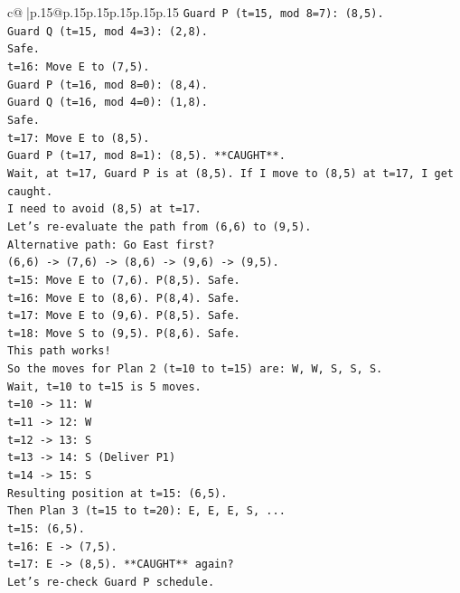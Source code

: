 \documentclass{article}
\begin{document}
{\begin{supertabular}{c@{$\;$}|p{.15\linewidth}@{}p{.15\linewidth}p{.15\linewidth}p{.15\linewidth}p{.15\linewidth}p{.15\linewidth}}
{{{\texttt{Guard P (t=15, mod 8=7): (8,5).} \\
\texttt{Guard Q (t=15, mod 4=3): (2,8).} \\
\texttt{Safe.} \\
\texttt{t=16: Move E to (7,5).} \\
\texttt{Guard P (t=16, mod 8=0): (8,4).} \\
\texttt{Guard Q (t=16, mod 4=0): (1,8).} \\
\texttt{Safe.} \\
\texttt{t=17: Move E to (8,5).} \\
\texttt{Guard P (t=17, mod 8=1): (8,5). **CAUGHT**.} \\
\texttt{Wait, at t=17, Guard P is at (8,5). If I move to (8,5) at t=17, I get caught.} \\
\texttt{I need to avoid (8,5) at t=17.} \\
\texttt{Let's re{-}evaluate the path from (6,6) to (9,5).} \\
\texttt{Alternative path: Go East first?} \\
\texttt{(6,6) {-}> (7,6) {-}> (8,6) {-}> (9,6) {-}> (9,5).} \\
\texttt{t=15: Move E to (7,6). P(8,5). Safe.} \\
\texttt{t=16: Move E to (8,6). P(8,4). Safe.} \\
\texttt{t=17: Move E to (9,6). P(8,5). Safe.} \\
\texttt{t=18: Move S to (9,5). P(8,6). Safe.} \\
\texttt{This path works!} \\
\texttt{So the moves for Plan 2 (t=10 to t=15) are: W, W, S, S, S.} \\
\texttt{Wait, t=10 to t=15 is 5 moves.} \\
\texttt{t=10 {-}> 11: W} \\
\texttt{t=11 {-}> 12: W} \\
\texttt{t=12 {-}> 13: S} \\
\texttt{t=13 {-}> 14: S (Deliver P1)} \\
\texttt{t=14 {-}> 15: S} \\
\texttt{Resulting position at t=15: (6,5).} \\
\texttt{Then Plan 3 (t=15 to t=20): E, E, E, S, ...} \\
\texttt{t=15: (6,5).} \\
\texttt{t=16: E {-}> (7,5).} \\
\texttt{t=17: E {-}> (8,5). **CAUGHT** again?} \\
\texttt{Let's re{-}check Guard P schedule.} \\
}}}
\end{supertabular}}
\end{document}
